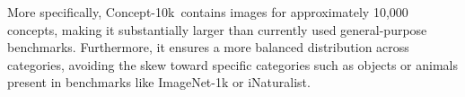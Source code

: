 \documentclass[11pt]{article}
\newcommand{\resource}{Concept-pedia}
\newcommand{\benchmark}{Concept-10k}
\begin{document}
More specifically, \benchmark~contains images for approximately 10,000 concepts, making it substantially larger than currently used general-purpose benchmarks. 
Furthermore, it ensures a more balanced distribution across categories, avoiding the skew toward specific categories such as objects or animals present in benchmarks like ImageNet-1k or iNaturalist.

%
\end{document}
